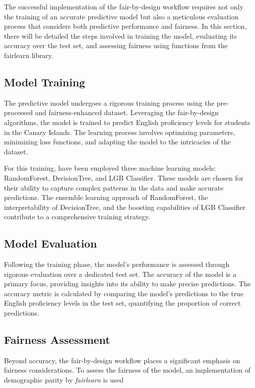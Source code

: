 \documentclass[12pt,a4paper,openright,twoside]{book}
\begin{document}
The successful implementation of the fair-by-design workflow requires not only the training of an accurate predictive model but also a meticulous evaluation process that considers both predictive performance and fairness. In this section, there will be detailed the steps involved in training the model, evaluating its accuracy over the test set, and assessing fairness using functions from the fairlearn library.

\subsection{Model Training}

The predictive model undergoes a rigorous training process using the pre-processed and fairness-enhanced dataset. Leveraging the fair-by-design algorithms, the model is trained to predict English proficiency levels for students in the Canary Islands. The learning process involves optimizing parameters, minimizing loss functions, and adapting the model to the intricacies of the dataset.

For this training, have been employed three machine learning models: RandomForest, DecisionTree, and LGB Classifier. These models are chosen for their ability to capture complex patterns in the data and make accurate predictions. The ensemble learning approach of RandomForest, the interpretability of DecisionTree, and the boosting capabilities of LGB Classifier contribute to a comprehensive training strategy.

\subsection{Model Evaluation}

Following the training phase, the model's performance is assessed through rigorous evaluation over a dedicated test set. The accuracy of the model is a primary focus, providing insights into its ability to make precise predictions. The accuracy metric is calculated by comparing the model's predictions to the true English proficiency levels in the test set, quantifying the proportion of correct predictions.

\subsection{Fairness Assessment}

Beyond accuracy, the fair-by-design workflow places a significant emphasis on fairness considerations. To assess the fairness of the model, an implementation of demographic parity by \emph{fairlearn} is used
\end{document}
